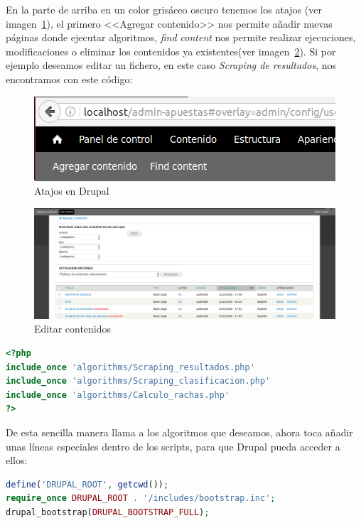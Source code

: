 En la parte de arriba en un color grisáceo oscuro tenemos los atajos (ver imagen~\ref{fig:AtajDru}), el primero <<Agregar contenido>> nos permite añadir nuevas páginas donde ejecutar algoritmos, \textit{find content} nos permite realizar ejecuciones, modificaciones o eliminar los contenidos ya existentes(ver imagen~\ref{fig:FindCont}). Si por ejemplo deseamos editar un fichero, en este caso \textit{Scraping de resultados}, nos encontramos con este código: 
\begin{figure}
\centering
\includegraphics[width=.5\textwidth]{img/drupal_atajos}
\caption{Atajos en Drupal}
\label{fig:AtajDru}
\end{figure}
\begin{figure}
\centering
\includegraphics[width=.9\textwidth]{img/drupal_find_content}
\caption{Editar contenidos}
\label{fig:FindCont}
\end{figure}

\begin{minipage}{\linewidth}
\begin{lstlisting}[language=PHP,tabsize=4,frame = single,caption=Código para ejecutar los algoritmos. ,captionpos=b,label=lst:pruebaPHP]
<?php
include_once 'algorithms/Scraping_resultados.php'
include_once 'algorithms/Scraping_clasificacion.php'
include_once 'algorithms/Calculo_rachas.php'
?>
\end{lstlisting}
\end{minipage}

De esta sencilla manera llama a los algoritmos que deseamos, ahora toca añadir unas líneas especiales dentro de los scripts, para que Drupal pueda acceder a ellos:

\begin{lstlisting}[language=PHP,tabsize=4,frame = single,caption=Código que se pone al principio de los scripts para la lectura desde Drupal.''. ,captionpos=b,label=lst:pruebaPHP]
define('DRUPAL_ROOT', getcwd());
require_once DRUPAL_ROOT . '/includes/bootstrap.inc';
drupal_bootstrap(DRUPAL_BOOTSTRAP_FULL);
\end{lstlisting}

